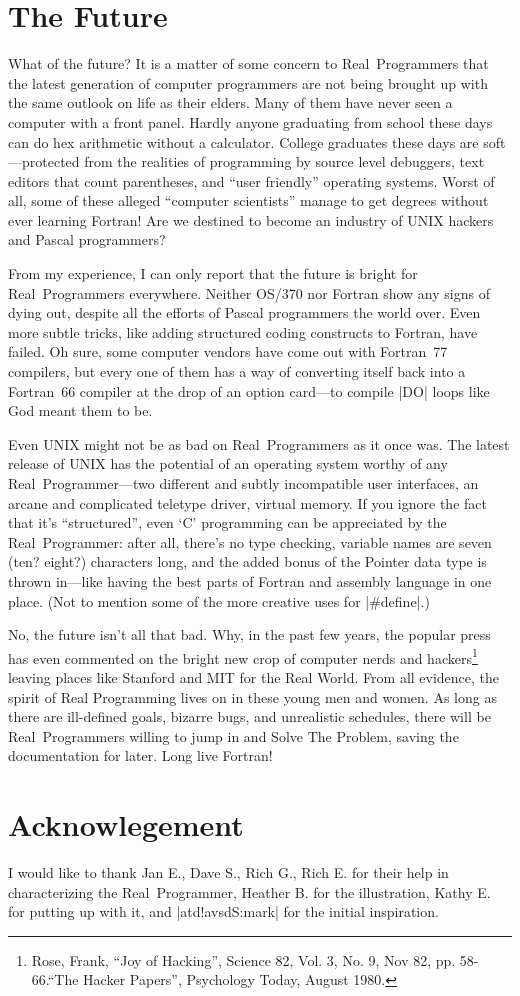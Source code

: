 \documentclass[10pt,letterpaper]{article}
\newcommand{\acro}[1]{{\small #1\spacefactor1000}}
\begin{document}
\section*{The Future}
What of the future? It is a matter of some concern to Real~Programmers
that the latest generation of computer programmers are not being
brought up with the same outlook on life as their elders. Many of them
have never seen a computer with a front panel. Hardly anyone
graduating from school these days can do hex arithmetic without a
calculator. College graduates these days are soft---protected from the
realities of programming by source level debuggers, text editors that
count parentheses, and ``user friendly'' operating systems. Worst of
all, some of these alleged ``computer scientists'' manage to get degrees
without ever learning Fortran! Are we destined to become an industry
of \acro{UNIX} hackers and Pascal programmers?

From my experience, I can only report that the future is bright for
Real~Programmers everywhere. Neither \acro{OS/370} nor Fortran show any signs
of dying out, despite all the efforts of Pascal programmers the
world over. Even more subtle tricks, like adding structured coding
constructs to Fortran, have failed. Oh sure, some computer vendors
have come out with Fortran~77 compilers, but every one of them has a
way of converting itself back into a Fortran~66 compiler at the drop
of an option card---to compile |DO| loops like God meant them to be.

Even \acro{UNIX} might not be as bad on Real~Programmers as it once was. The
latest release of \acro{UNIX} has the potential of an operating system worthy
of any Real~Programmer---two different and subtly incompatible user
interfaces, an arcane and complicated teletype driver, virtual
memory. If you ignore the fact that it's ``structured'', even `\acro{C}'
programming can be appreciated by the Real~Programmer: after all,
there's no type checking, variable names are seven (ten? eight?)
characters long, and the added bonus of the Pointer data type is
thrown in---like having the best parts of Fortran and assembly
language in one place. (Not to mention some of the more creative uses
for |\#define|.)

No, the future isn't all that bad. Why, in the past few years, the
popular press has even commented on the bright new crop of computer
nerds and hackers\footnote{%
Rose, Frank, ``Joy of Hacking'', Science 82, Vol. 3, No. 9, Nov 82, pp. 58-66.\hfil\break ``The Hacker Papers'', Psychology Today, August 1980.} leaving
places like Stanford and \acro{MIT}
for the Real World. From all evidence, the spirit of Real Programming
lives on in these young men and women. As long as there are
ill-defined goals, bizarre bugs, and unrealistic schedules, there will
be Real~Programmers willing to jump in and Solve The Problem, saving
the documentation for later. Long live Fortran!

\section*{Acknowlegement}
I would like to thank Jan E., Dave S., Rich G., Rich E. for their help
in characterizing the Real~Programmer, Heather B. for the
illustration, Kathy E. for putting up with it, and |atd!avsdS:mark| for
the initial inspiration.
\end{document}
